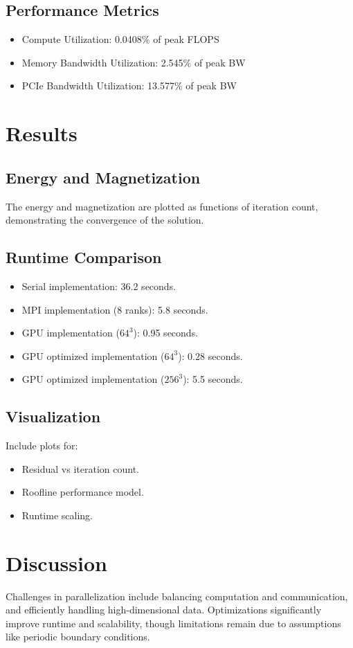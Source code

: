 \documentclass{article}
\begin{document}
\subsection{Performance Metrics}
\begin{itemize}
    \item Compute Utilization: 0.0408\% of peak FLOPS
    \item Memory Bandwidth Utilization: 2.545\% of peak BW
    \item PCIe Bandwidth Utilization: 13.577\% of peak BW
\end{itemize}

\section{Results}
\subsection{Energy and Magnetization}
The energy and magnetization are plotted as functions of iteration count, demonstrating the convergence of the solution.

\subsection{Runtime Comparison}
\begin{itemize}
    \item Serial implementation: 36.2 seconds.
    \item MPI implementation (8 ranks): 5.8 seconds.
    \item GPU implementation ($64^3$): 0.95 seconds.
    \item GPU optimized implementation ($64^3$): 0.28 seconds.
    \item GPU optimized implementation ($256^3$): 5.5 seconds.
\end{itemize}
\subsection{Visualization}
Include plots for:
\begin{itemize}
    \item Residual vs iteration count.
    \item Roofline performance model.
    \item Runtime scaling.
\end{itemize}

\section{Discussion}
Challenges in parallelization include balancing computation and communication, and efficiently handling high-dimensional data. Optimizations significantly improve runtime and scalability, though limitations remain due to assumptions like periodic boundary conditions.
\end{document}
